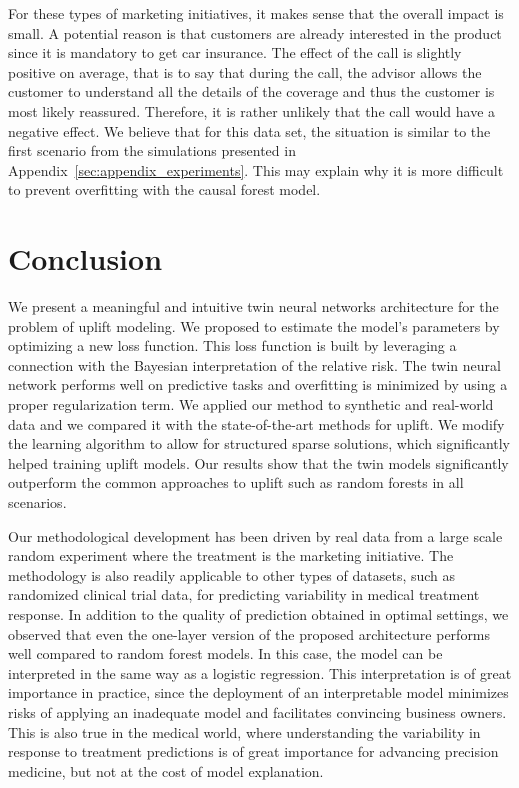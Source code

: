 \documentclass{article}
\begin{document}
For these types of marketing initiatives, it makes sense that the overall impact is small. A potential reason is that customers are already interested in the product since it is mandatory to get car insurance. The effect of the call is slightly positive on average, that is to say that during the call, the advisor allows the customer to understand all the details of the coverage and thus the customer is most likely reassured. Therefore, it is rather unlikely that the call would have a negative effect. We believe that for this data set, the situation is similar to the first scenario from the simulations presented in Appendix~\ref{sec:appendix_experiments}. This may explain why it is more difficult to prevent overfitting with the causal forest model.


\section{Conclusion}


We present a meaningful and intuitive twin neural networks architecture for the problem of uplift modeling. We proposed to  estimate the model's parameters by optimizing a new loss function. This loss function is built by leveraging a connection with the Bayesian interpretation of the relative risk. The twin neural network performs well on predictive tasks and overfitting is minimized by using a proper regularization term. We applied our method to synthetic and real-world data and we compared it with the state-of-the-art methods for uplift. We modify the learning algorithm to allow for structured sparse solutions, which significantly helped training uplift models. Our results show that the twin models significantly outperform the common approaches to uplift such as random forests in all scenarios.

Our methodological development has been driven by real data from a large scale random experiment where the treatment is the marketing initiative. The methodology is also readily applicable to other types of datasets, such as randomized clinical trial data, for predicting variability in medical treatment response. In addition to the quality of prediction obtained in optimal settings, we observed that even the one-layer version of the proposed architecture performs well compared to random forest models. In this case, the model can be interpreted in the same way as a logistic regression.
This interpretation is of great importance in practice, since the deployment of an interpretable model minimizes risks of applying an inadequate model and facilitates convincing business owners. This is also true in the medical world, where understanding the variability in response to treatment predictions is of great importance for advancing precision medicine, but not at the cost of model explanation. 
\end{document}
